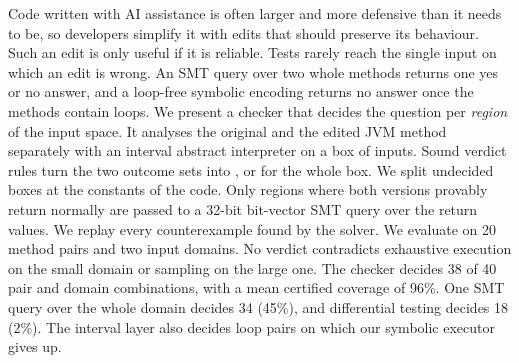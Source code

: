 Code written with AI assistance is often larger and more defensive than it needs to be, so
developers simplify it with edits that should preserve its behaviour. Such an edit is only
useful if it is reliable. Tests rarely reach the single input on which an edit is wrong. An
SMT query over two whole methods returns one yes or no answer, and a loop-free symbolic
encoding returns no answer once the methods contain loops. We present a checker that decides the question per
\emph{region} of the input space. It analyses the original and the edited JVM method
separately with an interval abstract interpreter on a box of inputs. Sound verdict rules turn
the two outcome sets into \pres{}, \chg{} or \unk{} for the whole box. We split undecided
boxes at the constants of the code. Only regions where both versions provably return normally
are passed to a 32-bit bit-vector SMT query over the return values. We replay every
counterexample found by the solver. We evaluate on 20 method pairs and two input domains. No
verdict contradicts exhaustive execution on the small domain or sampling on the large one. The
checker decides 38 of 40 pair and domain combinations, with a mean certified coverage of
96\%. One SMT query over the whole domain decides 34 (45\%), and differential testing decides
18 (2\%). The interval layer also decides loop pairs on which our symbolic executor gives up.
